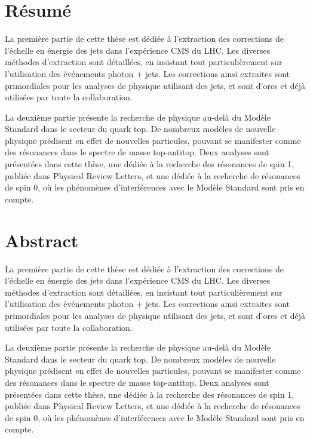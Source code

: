 \begingroup
\let\clearpage\relax
\let\cleardoublepage\relax
\let\cleardoublepage\relax

\chapter*{Résumé}

La première partie de cette thèse est dédiée à l'extraction des corrections de l'échelle en énergie des jets dans l'expérience CMS du LHC. Les diverses méthodes d'extraction sont détaillées, en insistant tout particulièrement sur l'utilisation des événements photon + jets. Les corrections ainsi extraites sont primordiales pour les analyses de physique utilisant des jets, et sont d'ores et déjà utilisées par toute la collaboration.

La deuxième partie présente la recherche de physique au-delà du Modèle Standard dans le secteur du quark top. De nombreux modèles de nouvelle physique prédisent en effet de nouvelles particules, pouvant se manifester comme des résonances dans le spectre de masse top-antitop. Deux analyses sont présentées dans cette thèse, une dédiée à la recherche des résonances de spin 1, publiée dans Physical Review Letters, et une dédiée à la recherche de résonances de spin 0, où les phénomènes d'interférences avec le Modèle Standard sont pris en compte.

\vfill

\chapter*{Abstract}

La première partie de cette thèse est dédiée à l'extraction des corrections de l'échelle en énergie des jets dans l'expérience CMS du LHC. Les diverses méthodes d'extraction sont détaillées, en insistant tout particulièrement sur l'utilisation des événements photon + jets. Les corrections ainsi extraites sont primordiales pour les analyses de physique utilisant des jets, et sont d'ores et déjà utilisées par toute la collaboration.

La deuxième partie présente la recherche de physique au-delà du Modèle Standard dans le secteur du quark top. De nombreux modèles de nouvelle physique prédisent en effet de nouvelles particules, pouvant se manifester comme des résonances dans le spectre de masse top-antitop. Deux analyses sont présentées dans cette thèse, une dédiée à la recherche des résonances de spin 1, publiée dans Physical Review Letters, et une dédiée à la recherche de résonances de spin 0, où les phénomènes d'interférences avec le Modèle Standard sont pris en compte.

\endgroup

\vfill
